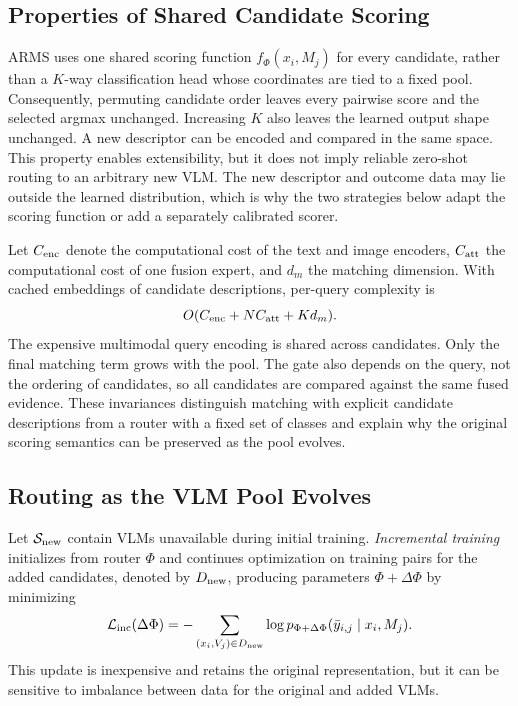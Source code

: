 \documentclass[letterpaper]{article}
\begin{document}
\subsection{Properties of Shared Candidate Scoring}

ARMS uses one shared scoring function $f_{\Phi}(x_i,M_j)$ for every candidate,
rather than a $K$-way classification head whose coordinates are tied to a fixed
pool. Consequently, permuting candidate order leaves every pairwise score and
the selected argmax unchanged. Increasing $K$ also leaves the learned output
shape unchanged. A new descriptor can be encoded and compared in the same
space. This property enables extensibility, but it does not imply reliable
zero-shot routing to an arbitrary new VLM. The new descriptor and outcome data
may lie outside the learned distribution, which is why the two strategies below
adapt the scoring function or add a separately calibrated scorer.

Let $C_{\rm enc}$ denote the computational cost of the text and image encoders,
$C_{\rm att}$ the computational cost of one fusion expert, and $d_m$ the
matching dimension.
With cached embeddings of candidate descriptions, per-query complexity is
\begin{equation}
O(C_{\rm enc}+N C_{\rm att}+K d_m).
\end{equation}
The expensive multimodal query encoding is shared across candidates. Only the
final matching term grows with the pool. The gate also depends on the query,
not the ordering of candidates, so all candidates are compared against the same fused
evidence. These invariances distinguish matching with explicit candidate
descriptions from a router with a fixed set of classes and explain why the
original scoring semantics can be preserved as the pool evolves.

\subsection{Routing as the VLM Pool Evolves}

Let $\mathcal{S}_{\rm new}$ contain VLMs unavailable during initial training.
\emph{Incremental training} initializes from router $\Phi$ and continues
optimization on training pairs for the added candidates, denoted by
$D_{\rm new}$, producing parameters
$\Phi+\Delta\Phi$ by minimizing
\begin{equation}
\mathcal{L}_{\rm inc}(\Delta\Phi)=
-\sum_{(x_i,V_j)\in D_{\rm new}}
\log p_{\Phi+\Delta\Phi}(\bar y_{i,j}\mid x_i,M_j).
\label{eq:incremental}
\end{equation}
This update is inexpensive and retains the original representation, but it can
be sensitive to imbalance between data for the original and added VLMs.
\end{document}
